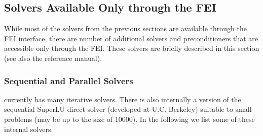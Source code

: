 \subsection{Solvers Available Only through the FEI} 
While most of the solvers from the previous sections are available through
the FEI interface, there are number of additional solvers and preconditioners
that are accessible only through the FEI.
These solvers are briefly described in this section (see also the reference manual).


%
%
\subsubsection{Sequential and Parallel Solvers} 

\hypre{} currently has many iterative solvers. There is also internally a
version of the sequential {\sf SuperLU} direct solver (developed at U.C.
Berkeley) suitable to small problems (may be up to the size of $10000$).
In the following we list some of these internal solvers.

